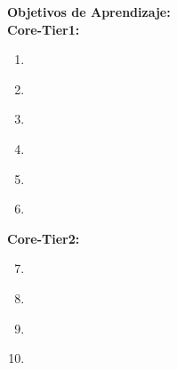 \noindent \textbf{Objetivos de Aprendizaje:}\\
\noindent \textbf{Core-Tier1:}
\begin{enumerate}
	\setcounter{enumi}{0}
	\item \ALAlgorithmicStrategiesLOFor\xspace[\ALAlgorithmicStrategiesLOForLevel]\label{sec:BOK:ALAlgorithmicStrategiesLOFor}
	\item \ALAlgorithmicStrategiesLOUseA\xspace[\ALAlgorithmicStrategiesLOUseALevel]\label{sec:BOK:ALAlgorithmicStrategiesLOUseA}
	\item \ALAlgorithmicStrategiesLOUseAConquer\xspace[\ALAlgorithmicStrategiesLOUseAConquerLevel]\label{sec:BOK:ALAlgorithmicStrategiesLOUseAConquer}
	\item \ALAlgorithmicStrategiesLOUseRecursive\xspace[\ALAlgorithmicStrategiesLOUseRecursiveLevel]\label{sec:BOK:ALAlgorithmicStrategiesLOUseRecursive}
	\item \ALAlgorithmicStrategiesLOUseDynamic\xspace[\ALAlgorithmicStrategiesLOUseDynamicLevel]\label{sec:BOK:ALAlgorithmicStrategiesLOUseDynamic}
	\item \ALAlgorithmicStrategiesLODetermineAn\xspace[\ALAlgorithmicStrategiesLODetermineAnLevel]\label{sec:BOK:ALAlgorithmicStrategiesLODetermineAn}
\end{enumerate}
\noindent \textbf{Core-Tier2:}
\begin{enumerate}
	\setcounter{enumi}{6}
	\item \ALAlgorithmicStrategiesLODescribe\xspace[\ALAlgorithmicStrategiesLODescribeLevel]\label{sec:BOK:ALAlgorithmicStrategiesLODescribe}
	\item \ALAlgorithmicStrategiesLOUseATo\xspace[\ALAlgorithmicStrategiesLOUseAToLevel]\label{sec:BOK:ALAlgorithmicStrategiesLOUseATo}
	\item \ALAlgorithmicStrategiesLODescribeThe\xspace[\ALAlgorithmicStrategiesLODescribeTheLevel]\label{sec:BOK:ALAlgorithmicStrategiesLODescribeThe}
	\item \ALAlgorithmicStrategiesLODescribeHow\xspace[\ALAlgorithmicStrategiesLODescribeHowLevel]\label{sec:BOK:ALAlgorithmicStrategiesLODescribeHow}
\end{enumerate}


